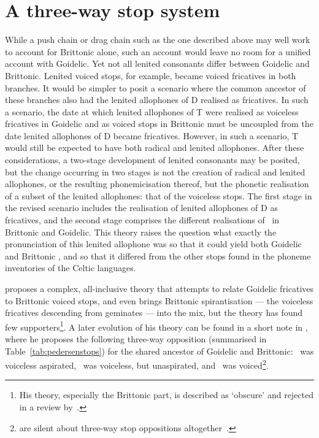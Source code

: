 \section{A three-way stop system}
\label{sec:three-way-stop}
While a push chain or drag chain such as the one described above may well work to account for Brittonic alone, such an account would leave no room for a unified account with Goidelic. Yet not all lenited consonants differ between Goidelic and Brittonic. Lenited voiced stops, for example, became voiced fricatives in both branches. It would be simpler to posit a scenario where the common ancestor of these branches also had the lenited allophones of \gls{D} realised as fricatives. In such a scenario, the date at which lenited allophones of \gls{T} were realised as voiceless fricatives in Goidelic and as voiced stops in Brittonic must be uncoupled from the date lenited allophones of \gls{D} became fricatives. However, in such a scenario, \gls{T} would still be expected to have both radical and lenited allophones.  After these considerations, a two-stage development of lenited consonants may be posited, but the change occurring in two stages is not the creation of radical and lenited allophones, or the resulting phonemicisation thereof, but the phonetic realisation of a subset of the lenited allophones: that of the voiceless stops. The first stage in the revised scenario includes the realisation of lenited allophones of \gls{D} as fricatives, and the second stage  comprises the different realisations of \lT\ in Brittonic and Goidelic. This theory raises the question what exactly the pronunciation of this lenited allophone was so that it could yield both Goidelic and Brittonic \lT, and so that it differed from the other stops found in the phoneme inventories of the Celtic languages.

\Textcite{Ped_Aspirationen97} proposes a complex, all-inclusive theory that attempts  to relate  Goidelic  fricatives to Brittonic voiced stops, and even brings Brittonic spirantisation — the voiceless fricatives descending from geminates — into the mix, but the theory has found few supporters\footnote{His theory, especially the Brittonic part, is described as `obscure' and rejected in a review by~\textcite{Str_Erschienene99}.}. A later evolution of his theory can be found in a short note in  \textcite[§§~149,~303]{Ped_Vergleichende09}, where he proposes the following three-way opposition (summarised in Table~\ref{tab:pedersenstops}) for the shared ancestor of Goidelic and Brittonic: \xT\ was voiceless aspirated, \lT\ was voiceless, but unaspirated, and \xD\ was voiced\footnote{\Textcite{LP_Concise37} are silent about three-way stop oppositions altogether~\autocite[§~131]{jackson_language_1953}.}.

